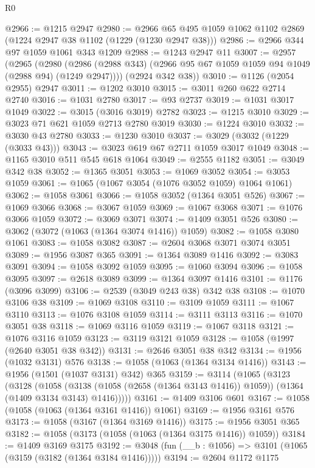 \begin{lexlean}{R0}
\begin{coremodule}
@2966 := @1215 @2947
@2980 := @2966 @65 @495 @1059 @1062 @1102 @2869 (@1224 @2947 @38 @1102 (@1229 (@1230 @2947 @38)))
@2986 := @2966 @344 @97 @1059 @1061 @343 @1209
@2988 := @1243 @2947 @11
@3007 := @2957
    (@2965
      (@2980 (@2986 (@2988 @343) (@2966 @95 @67 @1059 @1059 @94 @1049 (@2988 @94) (@1249 @2947))))
      (@2924 @342 @38))
@3010 := @1126 (@2054 @2955) @2947
@3011 := @1202 @3010
@3015 := @3011 @260 @622 @2714 @2740
@3016 := @1031 @2780
@3017 := @93 @2737
@3019 := @1031 @3017 @1049
@3022 := @3015 (@3016 @3019) @2782
@3023 := @1215 @3010
@3029 := @3023 @71 @621 @1059 @2713 @2780 @3019
@3030 := @1224 @3010
@3032 := @3030 @43 @2780
@3033 := @1230 @3010
@3037 := @3029 (@3032 (@1229 (@3033 @43)))
@3043 := @3023 @619 @67 @2711 @1059 @3017 @1049
@3048 := @1165 @3010 @511 @545 @618 @1064
@3049 := @2555 @1182
@3051 := @3049 @342 @38
@3052 := @1365 @3051
@3053 := @1069 @3052
@3054 := @3053 @1059
@3061 := @1065 (@1067 @3054 (@1076 @3052 @1059) @1064 @1061)
@3062 := @1058 @3061
@3066 := @1058 @3052 (@1364 @3051 @526)
@3067 := @1069 @3066
@3068 := @3067 @1059
@3069 := @1067 @3068
@3071 := @1076 @3066 @1059
@3072 := @3069 @3071
@3074 := @1409 @3051 @526
@3080 := @3062 (@3072 (@1063 (@1364 @3074 @1416)) @1059)
@3082 := @1058 @3080 @1061
@3083 := @1058 @3082
@3087 := @2604 @3068 @3071 @3074 @3051
@3089 := @1956 @3087 @365
@3091 := @1364 @3089 @1416
@3092 := @3083 @3091
@3094 := @1058 @3092 @1059
@3095 := @1060 @3094
@3096 := @1058 @3095
@3097 := @2618 @3089
@3099 := @1364 @3097 @1416
@3101 := @1176 (@3096 @3099)
@3106 := @2539 (@3049 @243 @38) @342 @38
@3108 := @1070 @3106 @38
@3109 := @1069 @3108
@3110 := @3109 @1059
@3111 := @1067 @3110
@3113 := @1076 @3108 @1059
@3114 := @3111 @3113
@3116 := @1070 @3051 @38
@3118 := @1069 @3116 @1059
@3119 := @1067 @3118
@3121 := @1076 @3116 @1059
@3123 := @3119 @3121 @1059
@3128 := @1058 (@1997 (@2640 @3051 @38 @342))
@3131 := @2646 @3051 @38 @342
@3134 := @1956 (@1032 @3131) @576
@3138 := @1058 (@1063 (@1364 @3134 @1416))
@3143 := @1956 (@1501 (@1037 @3131) @342) @365
@3159 := @3114
    (@1065
      (@3123
        (@3128
          (@1058
            (@3138 (@1058 (@2658 (@1364 @3143 @1416)) @1059))
            (@1364 (@1409 @3134 @3143) @1416)))))
@3161 := @1409 @3106 @601
@3167 := @1058 (@1058 (@1063 (@1364 @3161 @1416)) @1061)
@3169 := @1956 @3161 @576
@3173 := @1058 (@3167 (@1364 @3169 @1416))
@3175 := @1956 @3051 @365
@3182 := @1058 (@3173 (@1058 (@1063 (@1364 @3175 @1416)) @1059))
@3184 := @1409 @3169 @3175
@3192 := @3048 (fun (__b : @1056) => @3101 (@1065 (@3159 (@3182 (@1364 @3184 @1416)))))
@3194 := @2604 @1172 @1175

\end{coremodule}
\end{lexlean}
